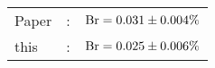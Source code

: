       \begin{tabular}{lcr}
          Paper &:& $\mathrm{Br}  = 0.031\pm 0.004\%$ \\
          this      &:& $\mathrm{Br}  = 0.025\pm 0.006\%$ \\        
      \end{tabular}
